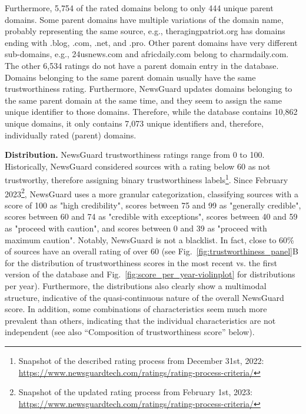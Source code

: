 \documentclass[12pt,twoside]{article}
\begin{document}
Furthermore, 5,754 of the rated domains belong to only 444 unique parent domains. 
Some parent domains have multiple variations of the domain name, probably representing the same source, e.g., theragingpatriot.org has domains ending with .blog, .com, .net,  and .pro. 
Other parent domains have very different sub-domains, e.g., 24usnews.com and africdaily.com belong to charmdaily.com. 
The other 6,534 ratings do not have a parent domain entry in the database. 
Domains belonging to the same parent domain usually have the same trustworthiness rating.
Furthermore, NewsGuard updates domains belonging to the same parent domain at the same time, and they seem to assign the same unique identifier to those domains. 
Therefore, while the database contains 10,862 unique domains, it only contains 7,073 unique identifiers and, therefore, individually rated (parent) domains. 

\textbf{Distribution.} NewsGuard trustworthiness ratings range from 0 to 100. 
Historically, NewsGuard considered sources with a rating below 60 as not trustworthy, therefore assigning binary trustworthiness labels\footnote{Snapshot of the described rating process from December 31st, 2022: \href{https://web.archive.org/web/20221231134910/https://www.newsguardtech.com/ratings/rating-process-criteria/}{https://www.newsguardtech.com/ratings/rating-process-criteria/}}. 
Since February 2023\footnote{Snapshot of the updated rating process from February 1st, 2023: \href{https://web.archive.org/web/20230201003836/https://www.newsguardtech.com/ratings/rating-process-criteria/}{https://www.newsguardtech.com/ratings/rating-process-criteria/}}, NewsGuard uses a more granular categorization, classifying sources with a score of 100 as "high credibility", scores between 75 and 99 as "generally credible", scores between 60 and 74 as "credible with exceptions", scores between 40 and 59 as "proceed with caution", and scores between 0 and 39 as "proceed with maximum caution". 
Notably, NewsGuard is not a blacklist. 
In fact, close to 60\% of sources have an overall rating of over 60 (see Fig.~\ref{fig:trustworthiness_panel}B for the distribution of trustworthiness scores in the most recent vs. the first version of the database and Fig.~\ref{fig:score_per_year-violinplot} for distributions per year). 
Furthermore, the distributions also clearly show a multimodal structure, indicative of the quasi-continuous nature of the overall NewsGuard score. 
In addition, some combinations of characteristics seem much more prevalent than others, indicating that the individual characteristics are not independent (see also ``Composition of trustworthiness score'' below).
\end{document}
